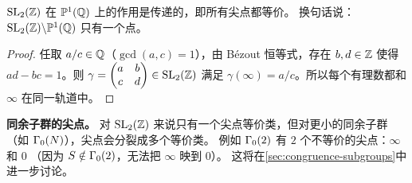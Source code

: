 \begin{proposition}
\label{prop:cusps-transitive}
$\mathrm{SL}_2(\mathbb{Z})$ 在 $\mathbb{P}^1(\mathbb{Q})$ 上的作用是传递的，即所有尖点都等价。
换句话说：$\mathrm{SL}_2(\mathbb{Z}) \backslash \mathbb{P}^1(\mathbb{Q})$ 只有一个点。
\end{proposition}

\begin{proof}
任取 $a/c \in \mathbb{Q}$（$\gcd(a,c) = 1$），由 Bézout 恒等式，存在 $b, d \in \mathbb{Z}$
使得 $ad - bc = 1$。则
$\gamma = \begin{pmatrix} a & b \\ c & d \end{pmatrix} \in \mathrm{SL}_2(\mathbb{Z})$
满足 $\gamma(\infty) = a/c$。所以每个有理数都和 $\infty$ 在同一轨道中。
\end{proof}

\textbf{同余子群的尖点。}
对 $\mathrm{SL}_2(\mathbb{Z})$ 来说只有一个尖点等价类，但对更小的同余子群
（如 $\Gamma_0(N)$），尖点会分裂成多个等价类。
例如 $\Gamma_0(2)$ 有 $2$ 个不等价的尖点：$\infty$ 和 $0$
（因为 $S \notin \Gamma_0(2)$，无法把 $\infty$ 映到 $0$）。
这将在\cref{sec:congruence-subgroups}中进一步讨论。


